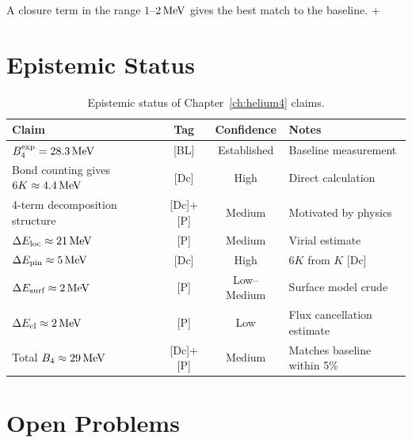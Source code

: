 A closure term in the range $1$--$2\,\mathrm{MeV}$ gives the best match to
the baseline. \tagP + \tagOPEN

\section{Epistemic Status}
\label{sec:he4:epistemic}

\begin{table}[h]
\centering
\caption{Epistemic status of Chapter~\ref{ch:helium4} claims.}
\label{tab:he4:epistemic}
\begin{tabular}{p{5cm}ccp{4.5cm}}
    \toprule
    Claim & Tag & Confidence & Notes \\
    \midrule
    $B_4^{\text{exp}} = 28.3\,\mathrm{MeV}$ & [BL] & Established & Baseline measurement \\
    Bond counting gives $6K \approx 4.4\,\mathrm{MeV}$ & [Dc] & High & Direct calculation \\
    4-term decomposition structure & [Dc]+[P] & Medium & Motivated by physics \\
    $\Delta E_{\text{loc}} \approx 21\,\mathrm{MeV}$ & [P] & Medium & Virial estimate \\
    $\Delta E_{\text{pin}} \approx 5\,\mathrm{MeV}$ & [Dc] & High & $6K$ from $K$ [Dc] \\
    $\Delta E_{\text{surf}} \approx 2\,\mathrm{MeV}$ & [P] & Low--Medium & Surface model crude \\
    $\Delta E_{\text{cl}} \approx 2\,\mathrm{MeV}$ & [P] & Low & Flux cancellation estimate \\
    Total $B_4 \approx 29\,\mathrm{MeV}$ & [Dc]+[P] & Medium & Matches baseline within 5\% \\
    \bottomrule
\end{tabular}
\end{table}

\section{Open Problems}
\label{sec:he4:open}

